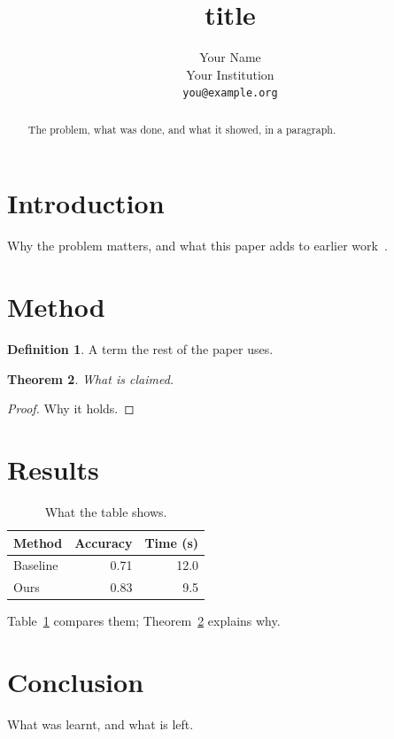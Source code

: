 \documentclass[11pt]{article}
\title{{{title}}}
\author{Your Name \\ \small Your Institution \\ \small\texttt{you@example.org}}
\date{}
\newtheorem{theorem}{Theorem}
\theoremstyle{definition}
\newtheorem{definition}[theorem]{Definition}
\begin{document}
\maketitle

\begin{abstract}
The problem, what was done, and what it showed, in a paragraph.
\end{abstract}

\section{Introduction}
\label{sec:introduction}

Why the problem matters, and what this paper adds to earlier work~\citep{knuth1984}.

\section{Method}
\label{sec:method}

\begin{definition}
  A term the rest of the paper uses.
\end{definition}

\begin{theorem}
  \label{thm:main}
  What is claimed.
\end{theorem}
\begin{proof}
  Why it holds.
\end{proof}

\section{Results}
\label{sec:results}

\begin{table}[ht]
  \centering
  \begin{tabular}{lrr}
    \toprule
    Method & Accuracy & Time (s) \\
    \midrule
    Baseline & 0.71 & 12.0 \\
    Ours     & 0.83 & 9.5 \\
    \bottomrule
  \end{tabular}
  \caption{What the table shows.}
  \label{tab:results}
\end{table}

Table~\ref{tab:results} compares them; Theorem~\ref{thm:main} explains why.

\section{Conclusion}
\label{sec:conclusion}

What was learnt, and what is left.



\end{document}

